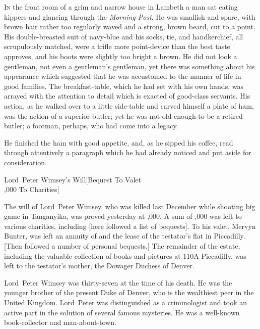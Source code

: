 
\lettrine{I}{n} the front room of a grim and narrow house in Lambeth a man sat eating kippers and glancing through the \textit{Morning Post}. He was smallish and spare, with brown hair rather too regularly waved and a strong, brown beard, cut to a point. His double-breasted suit of navy-blue and his socks, tie, and handkerchief, all scrupulously matched, were a trifle more point-device than the best taste approves, and his boots were slightly too bright a brown. He did not look a gentleman, not even a gentleman's gentleman, yet there was something about his appearance which suggested that he was accustomed to the manner of life in good families. The breakfast-table, which he had set with his own hands, was arrayed with the attention to detail which is exacted of good-class servants. His action, as he walked over to a little side-table and carved himself a plate of ham, was the action of a superior butler; yet he was not old enough to be a retired butler; a footman, perhaps, who had come into a legacy.

He finished the ham with good appetite, and, as he sipped his coffee, read through attentively a paragraph which he had already noticed and put aside for consideration.

\begin{newspaper}{Lord~Peter Wimsey's Will}[Bequest To Valet\\,000 To Charities]

The will of Lord~Peter Wimsey, who was killed last December while shooting big game in Tanganyika, was proved yesterday at ,000. A sum of ,000 was left to various charities, including [here followed a list of bequests]. To his valet, Mervyn Bunter, was left an annuity of  and the lease of the testator's flat in Piccadilly. [Then followed a number of personal bequests.] The remainder of the estate, including the valuable collection of books and pictures at 110A Piccadilly, was left to the testator's mother, the Dowager Duchess of Denver.

Lord~Peter Wimsey was thirty-seven at the time of his death. He was the younger brother of the present Duke of Denver, who is the wealthiest peer in the United Kingdom. Lord~Peter was distinguished as a criminologist and took an active part in the solution of several famous mysteries. He was a well-known book-collector and man-about-town.
\end{newspaper}

